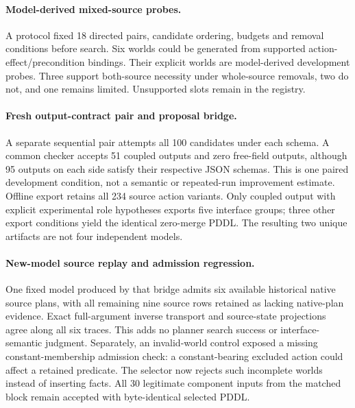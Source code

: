 \documentclass[letterpaper]{article}
\begin{document}
\paragraph{Model-derived mixed-source probes.}
A protocol fixed 18 directed pairs, candidate ordering, budgets and removal conditions before search. Six worlds could be generated from supported action-effect/precondition bindings. Their explicit worlds are model-derived development probes. Three support both-source necessity under whole-source removals, two do not, and one remains limited. Unsupported slots remain in the registry.


\paragraph{Fresh output-contract pair and proposal bridge.}
A separate sequential pair attempts all 100 candidates under each schema. A common checker accepts 51 coupled outputs and zero free-field outputs, although 95 outputs on each side satisfy their respective JSON schemas. This is one paired development condition, not a semantic or repeated-run improvement estimate. Offline export retains all 234 source action variants. Only coupled output with explicit experimental role hypotheses exports five interface groups; three other export conditions yield the identical zero-merge PDDL. The resulting two unique artifacts are not four independent models.


\paragraph{New-model source replay and admission regression.}
One fixed model produced by that bridge admits six available historical native source plans, with all remaining nine source rows retained as lacking native-plan evidence. Exact full-argument inverse transport and source-state projections agree along all six traces. This adds no planner search success or interface-semantic judgment. Separately, an invalid-world control exposed a missing constant-membership admission check: a constant-bearing excluded action could affect a retained predicate. The selector now rejects such incomplete worlds instead of inserting facts. All 30 legitimate component inputs from the matched block remain accepted with byte-identical selected PDDL.

\end{document}
